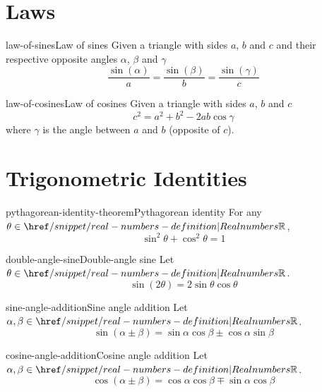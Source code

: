 \documentclass[preview]{standalone}
\begin{document}
\genpage

\section{Laws}

\begin{snippettheorem}{law-of-sines}{Law of sines}
    Given a triangle with sides \(a\), \(b\) and \(c\) and their respective opposite angles
    \(\alpha\), \(\beta\) and \(\gamma\)
    \[
        \frac{\sin(\alpha)}{a} =
        \frac{\sin(\beta)}{b} =
        \frac{\sin(\gamma)}{c}
    \]
\end{snippettheorem}

\begin{snippettheorem}{law-of-cosines}{Law of cosines}
    Given a triangle with sides \(a\), \(b\) and \(c\)
    \[
        c^2 = a^2 + b^2 - 2ab\cos\gamma
    \]
    where \(\gamma\) is the angle between \(a\) and \(b\) (opposite of \(c\)).
\end{snippettheorem}

\section{Trigonometric Identities}

\begin{snippettheorem}{pythagorean-identity-theorem}{Pythagorean identity}
    For any \(\theta \in \realnumbers\),
    \[
        \sin^2\theta + \cos^2\theta = 1
    \]
\end{snippettheorem}

\begin{snippetproposition}{double-angle-sine}{Double-angle sine}
    Let \(\theta \in \realnumbers\).
    \[ \sin(2\theta) = 2 \sin\theta\cos\theta \]
\end{snippetproposition}

\begin{snippetproposition}{sine-angle-addition}{Sine angle addition}
    Let \(\alpha,\beta \in \realnumbers\).
    \[ \sin(\alpha \pm \beta) = \sin\alpha\cos\beta \pm \cos\alpha\sin\beta \]
\end{snippetproposition}

\begin{snippetproposition}{cosine-angle-addition}{Cosine angle addition}
    Let \(\alpha,\beta \in \realnumbers\).
    \[ \cos(\alpha \pm \beta) = \cos\alpha\cos\beta \mp \sin\alpha\cos\beta \]
\end{snippetproposition}
\end{document}
